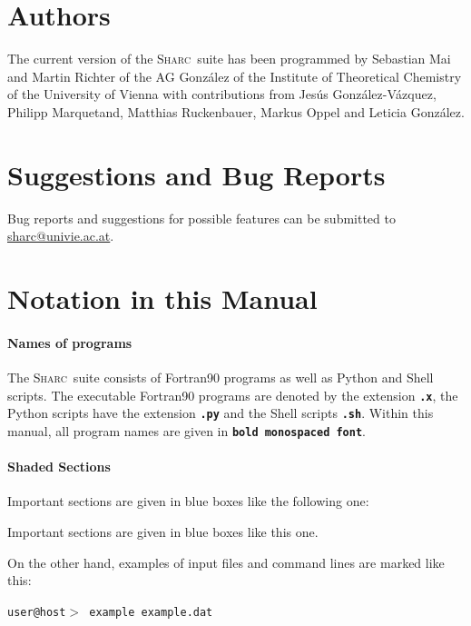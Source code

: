 \documentclass[a4paper,11pt,DIV=15,openany,twoside=false]{scrbook}
\newcommand{\tthdump}[1]{#1}
\newcommand{\sharc}{\textsc{Sharc}}
\newcommand{\ttt}[1]{\textbf{\texttt{#1}}}
\newenvironment{example}{
  \vspace{0mm}
  \definecolor{shadecolor}{HTML}{E4F4FF}
  \begin{shaded}
}{
  \end{shaded}
}
\begin{document}
\section{Authors}

The current version of the \sharc\ suite has been programmed by Sebastian Mai and Martin Richter of the AG Gonz\'alez of the Institute of Theoretical Chemistry of the University of Vienna with contributions from Jes\'us Gonz\'alez-V\'azquez, Philipp Marquetand, Matthias Ruckenbauer, Markus Oppel and Leticia Gonz\'alez.

\section{Suggestions and Bug Reports}

\begin{shaded}
Bug reports and suggestions for possible features can be submitted to \href{mailto:sharc@univie.ac.at}{sharc@univie.ac.at}.
\end{shaded}

\section{Notation in this Manual}

\paragraph{Names of programs}

The \sharc\ suite consists of Fortran90 programs as well as Python and Shell scripts. The executable Fortran90 programs are denoted by the extension \ttt{.x}, the Python scripts have the extension \ttt{.py} and the Shell scripts \ttt{.sh}. Within this manual, all program names are given in \ttt{bold monospaced font}.

\tthdump{
\paragraph{Shaded Sections}

Important sections are given in blue boxes like the following one:
\begin{shaded}
Important sections are given in blue boxes like this one.
\end{shaded}

On the other hand, examples of input files and command lines are marked like this:
\begin{example}
  \tt user@host$>$ example example.dat
\end{example}
}
\end{document}

